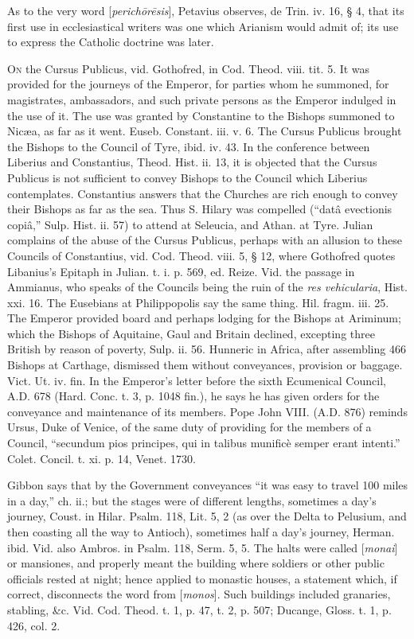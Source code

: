 As to the very word [\emph{perich\={o}r\={e}sis}],
Petavius observes, de Trin. iv. 16, § 4, that its first use in
ecclesiastical writers was one which Arianism would admit of; its use
to express the Catholic doctrine was later.


O\textsc{n} the Cursus Publicus, vid.
Gothofred, in Cod. Theod. viii. tit. 5. It was provided for the
journeys of the Emperor, for parties whom he summoned, for
magistrates, ambassadors, and such private persons as the Emperor
indulged in the use of it. The use was granted by Constantine to the
Bishops summoned to Nicæa, as far as it went. Euseb. Constant. iii.
v. 6. The Cursus Publicus brought the Bishops to the Council of Tyre,
ibid. iv. 43. In the conference between Liberius and Constantius,
Theod. Hist. ii. 13, it is objected that the Cursus Publicus is not
sufficient to convey Bishops to the Council which Liberius
contemplates. Constantius answers that the Churches are rich enough to
convey their Bishops as far as the sea. Thus S. Hilary was compelled (``datâ
evectionis copiâ,'' Sulp. Hist. ii. 57) to attend at Seleucia, and
Athan. at Tyre. Julian complains of the abuse of the Cursus Publicus,
perhaps with an allusion to these Councils of Constantius, vid. Cod.
Theod. viii. 5, § 12, where Gothofred quotes Libanius's Epitaph in
Julian. t. i. p. 569, ed. Reize. Vid. the passage in Ammianus, who
speaks of the Councils being the ruin of the \emph{res vehicularia},
Hist. xxi. 16. The Eusebians at Philippopolis say the same
thing. Hil. fragm. iii. 25. The Emperor provided board and perhaps
lodging for the Bishops at Ariminum; which the Bishops of
Aquitaine, Gaul and Britain declined, excepting three British by
reason of poverty, Sulp. ii. 56. Hunneric in Africa, after assembling
466 Bishops at Carthage, dismissed them without conveyances, provision
or baggage. Vict. Ut. iv. fin. In the Emperor's letter before the
sixth Ecumenical Council, A.D.
678 (Hard. Conc. t. 3, p. 1048 fin.), he says he has given orders for
the conveyance and maintenance of its members. Pope John VIII. (A.D.
876) reminds Ursus, Duke of Venice, of the same duty of providing for
the members of a Council, ``secundum pios principes, qui in talibus
munificè semper erant intenti.'' Colet. Concil. t. xi. p. 14, Venet.
1730.

Gibbon says that by the Government conveyances ``it
was easy to travel 100 miles in a day,'' ch. ii.; but the stages were
of different lengths, sometimes a day's journey, Coust. in Hilar.
Psalm. 118, Lit. 5, 2 (as over the Delta to Pelusium, and then
coasting all the way to Antioch), sometimes half a day's journey,
Herman. ibid. Vid. also Ambros. in Psalm. 118, Serm. 5, 5. The halts
were called [\emph{monai}] or mansiones, and properly meant the
building where soldiers or other public officials rested at night;
hence applied to monastic houses, a statement which, if correct,
disconnects the word from [\emph{monos}]. Such buildings included
granaries, stabling, \&c. Vid. Cod. Theod. t. 1, p. 47, t. 2, p.
507; Ducange, Gloss. t. 1, p. 426, col. 2.

